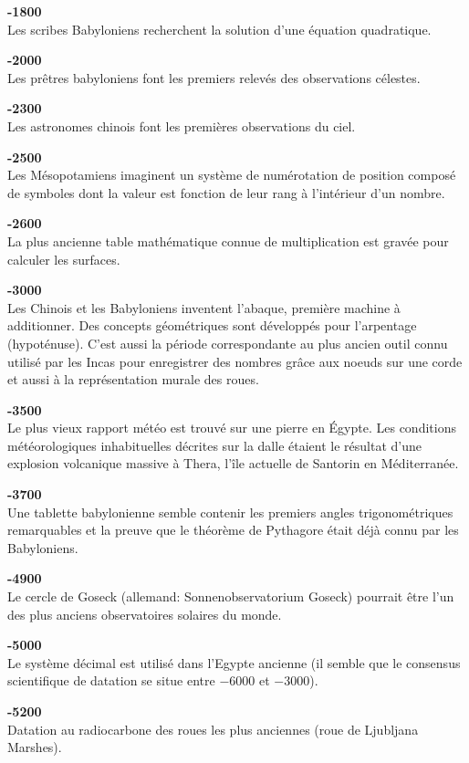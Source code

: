 \textbf{-1800}\\
Les scribes Babyloniens recherchent la solution d'une équation quadratique.

\textbf{-2000}\\
Les prêtres babyloniens font les premiers relevés des observations célestes.

\textbf{-2300}\\
Les astronomes chinois font les premières observations du ciel.

\textbf{-2500}\\
Les Mésopotamiens imaginent un système de numérotation de position composé de symboles dont la valeur est fonction de leur rang à l'intérieur d'un nombre.

\textbf{-2600}\\
La plus ancienne table mathématique connue de multiplication est gravée pour calculer les surfaces.

\textbf{-3000}\\
Les Chinois et les Babyloniens inventent l'abaque, première machine à additionner. Des concepts géométriques sont développés pour l'arpentage (hypoténuse). C'est aussi la période correspondante au plus ancien outil connu utilisé par les Incas pour enregistrer des nombres grâce aux noeuds sur une corde et aussi à la représentation murale des roues.

\textbf{-3500}\\
Le plus vieux rapport météo est trouvé sur une pierre en Égypte. Les conditions météorologiques inhabituelles décrites sur la dalle étaient le résultat d'une explosion volcanique massive à Thera, l'île actuelle de Santorin en Méditerranée.

\textbf{-3700}\\
Une tablette babylonienne semble contenir les premiers angles trigonométriques remarquables et la preuve que le théorème de Pythagore était déjà connu par les Babyloniens.

\textbf{-4900}\\
Le cercle de Goseck (allemand: Sonnenobservatorium Goseck) pourrait être l'un des plus anciens observatoires solaires du monde.

\textbf{-5000}\\
Le système décimal est utilisé dans l'Egypte ancienne (il semble que le consensus scientifique de datation se situe entre $-6000$ et $-3000$).

\textbf{-5200}\\
Datation au radiocarbone des roues les plus anciennes (roue de Ljubljana Marshes).

